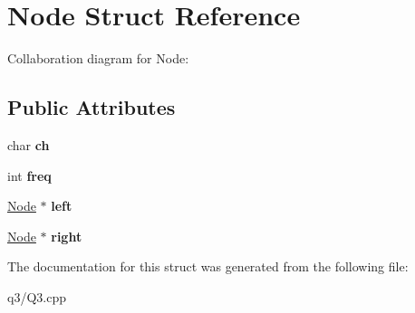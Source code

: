 \hypertarget{struct_node}{}\section{Node Struct Reference}
\label{struct_node}


Collaboration diagram for Node\+:
\subsection*{Public Attributes}
\begin{DoxyCompactItemize}
\item 
\mbox{\label{struct_node_a60b3924d995a47df096d90f9a926d7ba}} 
char {\bfseries ch}
\item 
\mbox{\label{struct_node_a93e1b0f2d619b5ce1b19d982e967e579}} 
int {\bfseries freq}
\item 
\mbox{\label{struct_node_ab8c667ac8fdb120ed4c031682a9cdaee}} 
\hyperlink{struct_node}{Node} $\ast$ {\bfseries left}
\item 
\mbox{\label{struct_node_afe5916d969cd32f7de1e4ba15580c989}} 
\hyperlink{struct_node}{Node} $\ast$ {\bfseries right}
\end{DoxyCompactItemize}


The documentation for this struct was generated from the following file\+:\begin{DoxyCompactItemize}
\item 
q3/Q3.\+cpp\end{DoxyCompactItemize}
